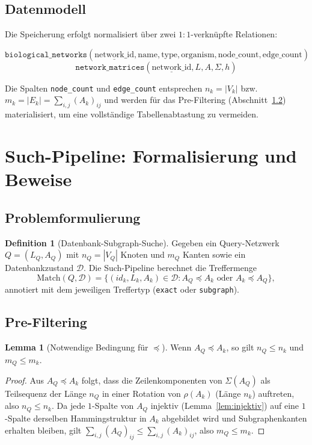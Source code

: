 \documentclass[a4paper,12pt]{article}
\theoremstyle{definition}
\newtheorem{definition}{Definition}
\newtheorem{lemma}{Lemma}
\begin{document}
\subsection{Datenmodell}

Die Speicherung erfolgt normalisiert über zwei $1{:}1$-verknüpfte Relationen:

\[
\texttt{biological\_networks}(\underline{\text{network\_id}}, \text{name}, \text{type}, \text{organism}, \text{node\_count}, \text{edge\_count})
\]
\[
\texttt{network\_matrices}(\underline{\text{network\_id}}, L, A, \Sigma, h)
\]

Die Spalten \texttt{node\_count} und \texttt{edge\_count} entsprechen $n_k = |V_k|$ bzw. $m_k = |E_k| = \sum_{i,j} (A_k)_{ij}$ und werden für das Pre-Filtering (Abschnitt~\ref{sec:prefilter}) materialisiert, um eine vollständige Tabellenabtastung zu vermeiden.

\section{Such-Pipeline: Formalisierung und Beweise}
\label{sec:pipeline}

\subsection{Problemformulierung}

\begin{definition}[Datenbank-Subgraph-Suche]
	Gegeben ein Query-Netzwerk $Q = (L_Q, A_Q)$ mit $n_Q = |V_Q|$ Knoten und $m_Q$ Kanten sowie ein Datenbankzustand $\mathcal{D}$. Die Such-Pipeline berechnet die Treffermenge
	\[
	\mathrm{Match}(Q, \mathcal{D}) = \{ (id_k, L_k, A_k) \in \mathcal{D} : A_Q \preceq A_k \text{ oder } A_k \preceq A_Q \},
	\]
	annotiert mit dem jeweiligen Treffertyp (\texttt{exact} oder \texttt{subgraph}).
\end{definition}

\subsection{Pre-Filtering}
\label{sec:prefilter}

\begin{lemma}[Notwendige Bedingung für $\preceq$]
	\label{lem:notwendig}
	Wenn $A_Q \preceq A_k$, so gilt $n_Q \le n_k$ und $m_Q \le m_k$.
\end{lemma}

\begin{proof}
	Aus $A_Q \preceq A_k$ folgt, dass die Zeilenkomponenten von $\Sigma(A_Q)$ als Teilsequenz der Länge $n_Q$ in einer Rotation von $\rho(A_k)$ (Länge $n_k$) auftreten, also $n_Q \le n_k$. Da jede $1$-Spalte von $A_Q$ injektiv (Lemma~\ref{lem:injektiv}) auf eine $1$-Spalte derselben Hammingstruktur in $A_k$ abgebildet wird und Subgraphenkanten erhalten bleiben, gilt $\sum_{i,j}(A_Q)_{ij} \le \sum_{i,j}(A_k)_{ij}$, also $m_Q \le m_k$.
\end{proof}
\end{document}
